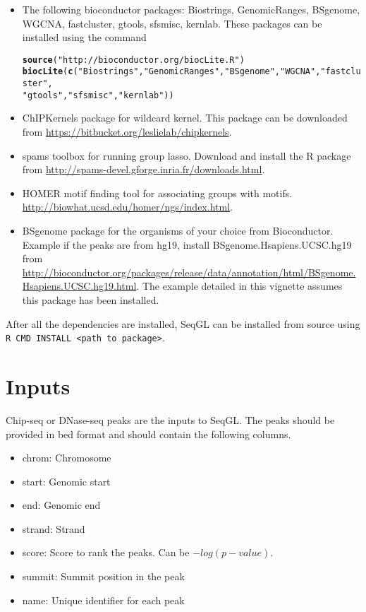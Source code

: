 \documentclass[10pt,oneside]{article}\usepackage[]{graphicx}\usepackage[]{color}
\makeatletter
\newcommand{\hlstr}[1]{\textcolor[rgb]{0.192,0.494,0.8}{#1}}%
\newcommand{\hlstd}[1]{\textcolor[rgb]{0.345,0.345,0.345}{#1}}%
\newcommand{\hlkwd}[1]{\textcolor[rgb]{0.737,0.353,0.396}{\textbf{#1}}}%
\newenvironment{kframe}{%
 \def\at@end@of@kframe{}%
 \ifinner\ifhmode%
  \def\at@end@of@kframe{\end{minipage}}%
  \begin{minipage}{\columnwidth}%
 \fi\fi%
 \def\FrameCommand##1{\hskip\@totalleftmargin \hskip-\fboxsep
 \colorbox{shadecolor}{##1}\hskip-\fboxsep
     \hskip-\linewidth \hskip-\@totalleftmargin \hskip\columnwidth}%
 \MakeFramed {\advance\hsize-\width
   \@totalleftmargin\z@ \linewidth\hsize
   \@setminipage}}%
 {\par\unskip\endMakeFramed%
 \at@end@of@kframe}
\newenvironment{knitrout}{}{} %
\makeatother
\begin{document}
\begin{itemize}
\item The following bioconductor packages: Biostrings, GenomicRanges, BSgenome, WGCNA, fastcluster, gtools, sfsmisc, kernlab. 
These packages can be installed using the command 
\begin{knitrout}
\color{fgcolor}\begin{kframe}
\begin{alltt}
\hlkwd{source}\hlstd{(}\hlstr{"http://bioconductor.org/biocLite.R"}\hlstd{)}
\hlkwd{biocLite}\hlstd{(}\hlkwd{c}\hlstd{(}\hlstr{"Biostrings"}\hlstd{,} \hlstr{"GenomicRanges"}\hlstd{,} \hlstr{"BSgenome"}\hlstd{,} \hlstr{"WGCNA"}\hlstd{,} \hlstr{"fastcluster"}\hlstd{,}
    \hlstr{"gtools"}\hlstd{,} \hlstr{"sfsmisc"}\hlstd{,} \hlstr{"kernlab"}\hlstd{))}
\end{alltt}
\end{kframe}
\end{knitrout}


\item ChIPKernels package for wildcard kernel. This package can be downloaded from \url{https://bitbucket.org/leslielab/chipkernels}.

\item spams toolbox for running group lasso. Download and install the R package from \url{http://spams-devel.gforge.inria.fr/downloads.html}.

\item HOMER motif finding tool for associating groups with motifs. \url{http://biowhat.ucsd.edu/homer/ngs/index.html}.

\item BSgenome package for the organisms of your choice from Bioconductor. Example if the peaks are from hg19, install BSgenome.Hsapiens.UCSC.hg19 from \url{http://bioconductor.org/packages/release/data/annotation/html/BSgenome.Hsapiens.UCSC.hg19.html}. The example detailed in this vignette assumes this package has been installed.

\end{itemize}

After all the dependencies are installed, SeqGL can be installed from source using \texttt{R CMD INSTALL <path to package>}.

\section{Inputs}
Chip-seq or DNase-seq peaks are the inputs to SeqGL. The peaks should be provided in bed format and should contain the following columns.
\begin{itemize}
\item chrom: Chromosome 
\item start: Genomic start
\item end: Genomic end
\item strand: Strand
\item score: Score to rank the peaks. Can be ${-log (p-value)}$.
\item summit: Summit position in the peak
\item name: Unique identifier for each peak
\end{itemize}
\end{document}
